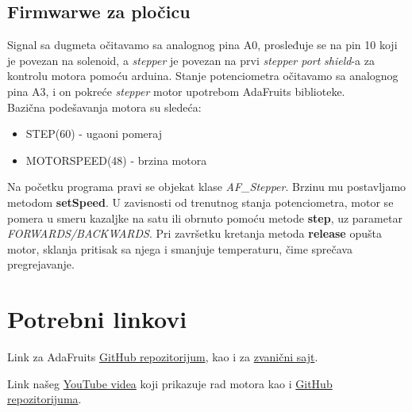 \documentclass[a4paper, 11pt, titlepage]{article}
\begin{document}
\subsection{Firmwarwe za pločicu}

Signal sa dugmeta očitavamo sa analognog pina A0, prosleđuje se na pin 10 koji je povezan na solenoid, a \textit{stepper} je povezan na prvi \textit{stepper port} \textit{shield}-a za kontrolu motora pomoću arduina. 
Stanje potenciometra očitavamo sa analognog pina A3, i on pokreće \textit{stepper} motor upotrebom AdaFruits biblioteke. \\

Bazična podešavanja motora su sledeća: 
\begin{itemize}
\item STEP(60) - ugaoni pomeraj
    \item MOTORSPEED(48) - brzina motora
\end{itemize}

Na početku programa pravi se objekat klase \textit{AF\_Stepper}. Brzinu mu postavljamo metodom \textbf{setSpeed}. U zavisnosti od trenutnog stanja potenciometra, motor se pomera u smeru kazaljke na satu ili obrnuto pomoću metode \textbf{step}, uz parametar \textit{FORWARDS/BACKWARDS}. Pri završetku kretanja metoda \textbf{release} opušta motor, sklanja pritisak sa njega i smanjuje temperaturu, čime sprečava pregrejavanje.



\newpage
\section{Potrebni linkovi}

Link za AdaFruits \href{https://github.com/adafruit/Adafruit_Motor-Shield-v1}{GitHub repozitorijum}, kao i za \href{https://learn.adafruit.com/adafruit-motor-shield/overview}{zvanični sajt}. 

Link našeg \href{https://youtube.com/shorts/waznABaG0Z0?feature=share}{YouTube videa} koji prikazuje rad motora kao i \href{https://github.com/antovic/LPRS2_2024/tree/main/Automotive/Diesel_Generator}{GitHub repozitorijuma}.
\end{document}
